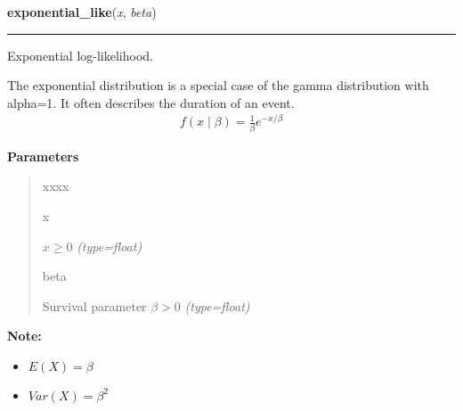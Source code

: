     \begin{boxedminipage}{\textwidth}

    \raggedright \textbf{exponential\_like}(\textit{x}, \textit{beta})

    \vspace{-1.5ex}

    \rule{\textwidth}{0.5\fboxrule}

Exponential log-likelihood.

The exponential distribution is a special case of the gamma distribution
with alpha=1. It often describes the duration of an event.
\begin{equation*}\begin{split}f(x \mid \beta) = \frac{1}{\beta}e^{-x/\beta}\end{split}\end{equation*}    \vspace{1ex}

      \textbf{Parameters}
      \begin{quote}
        \begin{Ventry}{xxxx}

          \item[x]


$x \ge 0$
            \textit{(type=float)}

          \item[beta]


Survival parameter $\beta > 0$
            \textit{(type=float)}

        \end{Ventry}

      \end{quote}

    \vspace{1ex}

\textbf{Note:} \begin{itemize}
\item {} 
$E(X) = \beta$

\item {} 
$Var(X) = \beta^2$

\end{itemize}


    \end{boxedminipage}

    \label{pymc:distributions:rexponweib}

    \vspace{0.5ex}

